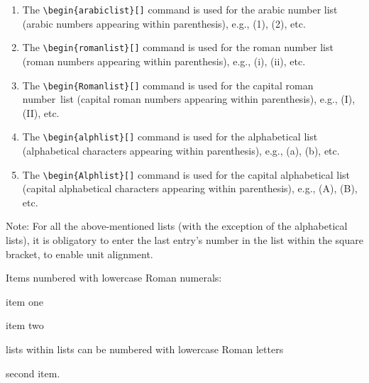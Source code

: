 \begin{enumerate}
\item The \verb|\begin{arabiclist}[]| command is used for the arabic
number list (arabic numbers appearing within parenthesis), e.g., (1),
(2), etc.

\smallskip

\item The \verb|\begin{romanlist}[]| command is used for the roman
number list (roman numbers appearing within parenthesis), e.g., (i),
(ii), etc.

\smallskip

\item The \verb|\begin{Romanlist}[]| command is used for the capital roman
\hbox{number list} (capital roman numbers appearing within parenthesis),
e.g., (I), (II), etc.

\smallskip

\item The \verb|\begin{alphlist}[]| command is used for the alphabetical
list (alphabetical characters appearing within parenthesis),
e.g., (a), (b), etc.

\smallskip

\item The \verb|\begin{Alphlist}[]| command is used for the capital
alphabetical list (capital alphabetical characters appearing within
parenthesis), e.g., (A), (B), etc.
\end{enumerate}

Note: For all the above-mentioned lists (with the exception of
the alphabetical lists), it is obligatory to enter the last
entry's number in the list within the square bracket, to enable unit
alignment.

Items numbered with lowercase Roman numerals:

\begin{romanlist}[(ii)]
\item item one
\item item two
    \begin{alphlist}[(a)]
    \item lists within lists can be numbered with lowercase Roman letters
    \item second item.
    \end{alphlist}
\end{romanlist}

